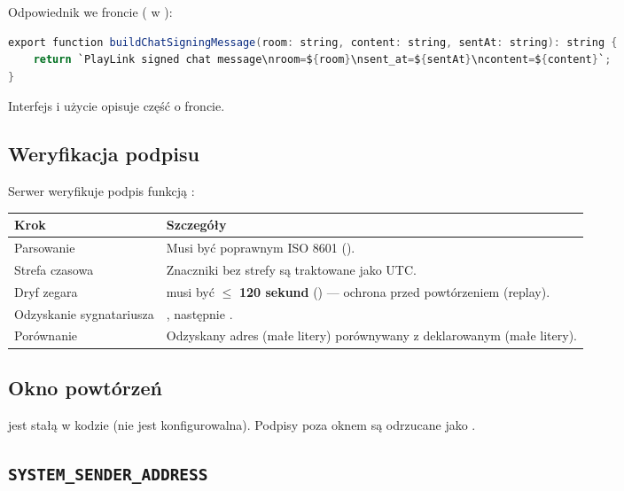 Odpowiednik we froncie ( w ):

\begin{lstlisting}[language=Java]
export function buildChatSigningMessage(room: string, content: string, sentAt: string): string {
    return `PlayLink signed chat message\nroom=${room}\nsent_at=${sentAt}\ncontent=${content}`;
}
\end{lstlisting}

Interfejs  i użycie  opisuje część o froncie.

\subsection{Weryfikacja podpisu}

Serwer weryfikuje podpis funkcją :

\begin{tabularx}{\textwidth}{lY}
\toprule
Krok & Szczegóły \\
\midrule
Parsowanie  & Musi być poprawnym ISO 8601 (). \\
Strefa czasowa & Znaczniki bez strefy są traktowane jako UTC. \\
Dryf zegara &  musi być $\leq$ \textbf{120 sekund} () --- ochrona przed powtórzeniem (replay). \\
Odzyskanie sygnatariusza & , następnie . \\
Porównanie & Odzyskany adres (małe litery) porównywany z deklarowanym  (małe litery). \\
\bottomrule
\end{tabularx}

\subsection{Okno powtórzeń}

 jest stałą w kodzie (nie jest konfigurowalna). Podpisy poza
oknem są odrzucane jako .

\subsection{\texttt{SYSTEM\_SENDER\_ADDRESS}}


